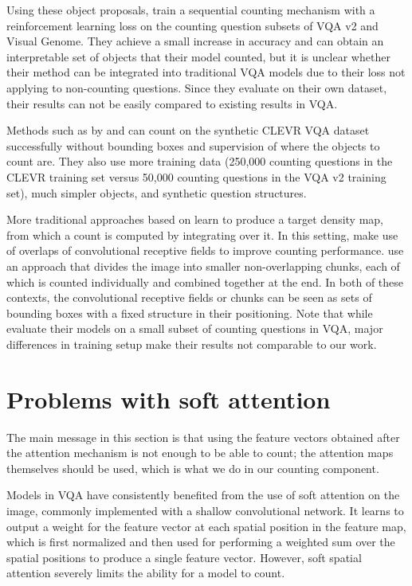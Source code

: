 \documentclass[letterpaper]{article}
\begin{document}
Using these object proposals, \citet{Trott2018a} train a sequential counting mechanism with a reinforcement learning loss on the counting question subsets of VQA v2 and Visual Genome.
They achieve a small increase in accuracy and can obtain an interpretable set of objects that their model counted, but it is unclear whether their method can be integrated into traditional VQA models due to their loss not applying to non-counting questions.
Since they evaluate on their own dataset, their results can not be easily compared to existing results in VQA.

Methods such as by \citet{Santoro2017a} and \citet{Perez2017a} can count on the synthetic CLEVR VQA dataset \citep{Johnson2017a} successfully without bounding boxes and supervision of where the objects to count are.
They also use more training data (250,000 counting questions in the CLEVR training set versus 50,000 counting questions in the VQA v2 training set), much simpler objects, and synthetic question structures.

More traditional approaches based on \citet{Lempitsky2010a} learn to produce a target density map, from which a count is computed by integrating over it.
In this setting, \citet{Cohen2017a} make use of overlaps of convolutional receptive fields to improve counting performance.
\citet{Chattopadhyay2017a} use an approach that divides the image into smaller non-overlapping chunks, each of which is counted individually and combined together at the end.
In both of these contexts, the convolutional receptive fields or chunks can be seen as sets of bounding boxes with a fixed structure in their positioning.
Note that while \citet{Chattopadhyay2017a} evaluate their models on a small subset of counting questions in VQA, major differences in training setup make their results not comparable to our work.


\section{Problems with soft attention}\label{sec:problems}
The main message in this section is that using the feature vectors obtained after the attention mechanism is not enough to be able to count;
the attention maps themselves should be used, which is what we do in our counting component.

Models in VQA have consistently benefited from the use of soft attention \citep{Mnih2014a, Bahdanau2014a} on the image, commonly implemented with a shallow convolutional network.
It learns to output a weight for the feature vector at each spatial position in the feature map, which is first normalized and then used for performing a weighted sum over the spatial positions to produce a single feature vector.
However, soft spatial attention severely limits the ability for a model to count.
\end{document}
